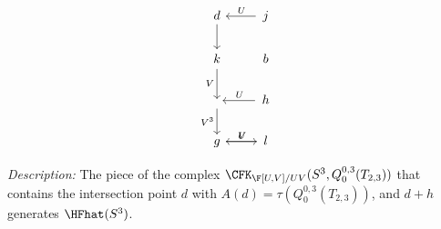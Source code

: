 \documentclass{article}
\begin{document}
\[
\begin{tikzcd}
d \arrow[d] & j \arrow[l,"U"',shorten <=1pt] \\
k \arrow[d,"V"',shorten <=1pt] & b \\
\arrow[d,"V^3"'] & h \arrow[l,"U"',shorten <=1pt] \\
g \arrow[r,"V",shorten >=1pt] & l \arrow[l,"U"',shorten <=1pt]
\end{tikzcd}
\]

\textit{Description:} The piece of the complex $\CFK_{\F[U,V]/UV}(S^3,Q^{0,3}_0(T_{2,3}))$ that contains the intersection point \( d \) with \( A(d) = \tau(Q^{0,3}_0(T_{2,3})) \), and \( d + h \) generates \( \HFhat(S^3) \).
\end{document}
